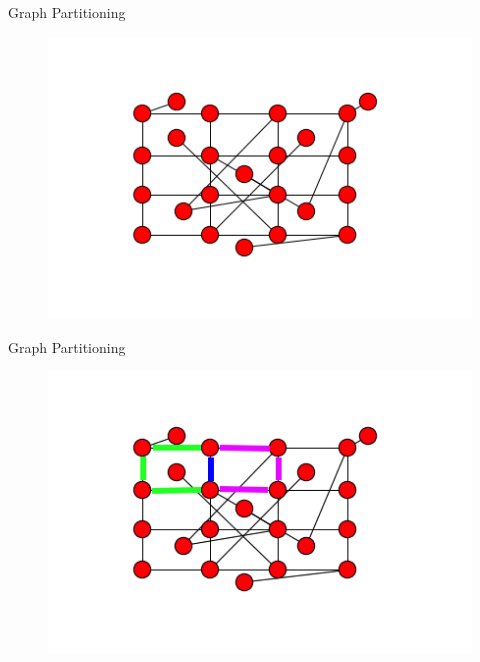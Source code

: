 \documentclass[xcolor=dvipsnames,10pt]{beamer}
\begin{document}
\begin{frame}{Graph Partitioning}
\begin{figure}
\begin{center}
\includegraphics[width = 4.5in]{entiregraph.png}
\end{center}
\end{figure}
\end{frame}
\begin{frame}{Graph Partitioning}
\begin{figure}
\begin{center}
\includegraphics[width = 4.5in]{goodedge.png}
\end{center}
\end{figure}
\end{frame}
\end{document}
